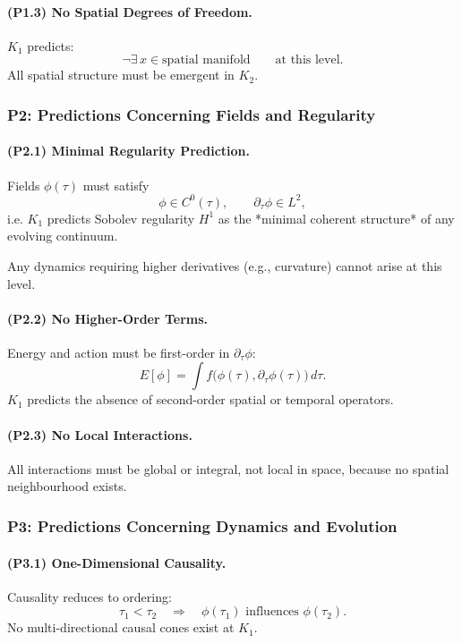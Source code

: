 \paragraph{(P1.3) No Spatial Degrees of Freedom.}
$K_1$ predicts:
\[
\neg \exists\, x \in \text{spatial manifold} \qquad\text{at this level}.
\]
All spatial structure must be emergent in $K_2$.

\subsubsection{P2: Predictions Concerning Fields and Regularity}

\paragraph{(P2.1) Minimal Regularity Prediction.}
Fields $\phi(\tau)$ must satisfy
\[
\phi \in C^0(\tau), \qquad \partial_\tau \phi \in L^2,
\]
i.e. $K_1$ predicts Sobolev regularity $H^1$ as the *minimal coherent
structure* of any evolving continuum.

Any dynamics requiring higher derivatives (e.g., curvature) cannot arise at
this level.

\paragraph{(P2.2) No Higher-Order Terms.}
Energy and action must be first-order in $\partial_\tau\phi$:
\[
E[\phi] = \int f\big(\phi(\tau), \partial_\tau\phi(\tau)\big)\, d\tau.
\]
$K_1$ predicts the absence of second-order spatial or temporal operators.

\paragraph{(P2.3) No Local Interactions.}
All interactions must be global or integral, not local in space, because no
spatial neighbourhood exists.

\subsubsection{P3: Predictions Concerning Dynamics and Evolution}

\paragraph{(P3.1) One-Dimensional Causality.}
Causality reduces to ordering:
\[
\tau_1 < \tau_2 \quad \Rightarrow \quad \phi(\tau_1) \text{ influences } \phi(\tau_2).
\]
No multi-directional causal cones exist at $K_1$.

